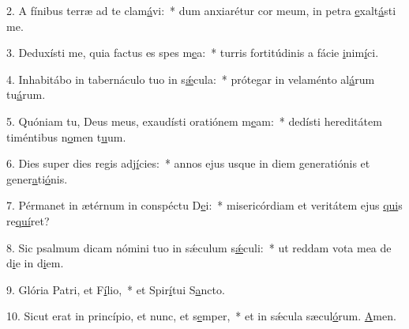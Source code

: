 2. A fínibus terræ ad te clam\uline{á}vi:~* dum anxiarétur cor meum, in petra \uline{e}xalt\uline{á}sti me.\par 
3. Deduxísti me, quia factus es spes m\uline{e}a:~* turris fortitúdinis a fácie \uline{i}nim\uline{í}ci.\par 
4. Inhabitábo in tabernáculo tuo in s\uline{ǽ}cula:~* prótegar in velaménto al\uline{á}rum tu\uline{á}rum.\par 
5. Quóniam tu, Deus meus, exaudísti oratiónem m\uline{e}am:~* dedísti hereditátem timéntibus n\uline{o}men t\uline{u}um.\par 
6. Dies super dies regis adj\uline{í}cies:~* annos ejus usque in diem generatiónis et gener\uline{a}ti\uline{ó}nis.\par 
7. Pérmanet in ætérnum in conspéctu D\uline{e}i:~* misericórdiam et veritátem ejus \uline{qui}s re\uline{quí}ret?\par 
8. Sic psalmum dicam nómini tuo in sǽculum s\uline{ǽ}culi:~* ut reddam vota mea de d\uline{i}e in d\uline{i}em.\par 
9. Glória Patri, et F\uline{í}lio,~* et Spir\uline{í}tui S\uline{a}ncto.\par 
10. Sicut erat in princípio, et nunc, et s\uline{e}mper,~* et in sǽcula sæcul\uline{ó}rum. \uline{A}men.\par 
